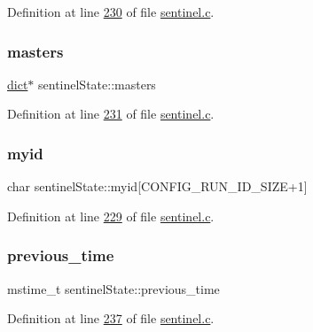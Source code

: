 Definition at line \hyperlink{sentinel_8c_source_l00230}{230} of file \hyperlink{sentinel_8c_source}{sentinel.\+c}.

\mbox{\label{structsentinelState_afa6f3bd36b144f6f7e4a68c659861951}} 
\subsubsection{\texorpdfstring{masters}{masters}}
{\footnotesize\ttfamily \hyperlink{structdict}{dict}$\ast$ sentinel\+State\+::masters}



Definition at line \hyperlink{sentinel_8c_source_l00231}{231} of file \hyperlink{sentinel_8c_source}{sentinel.\+c}.

\mbox{\label{structsentinelState_ad862cfc4b57ae5278c5e5f5109fd19d2}} 
\subsubsection{\texorpdfstring{myid}{myid}}
{\footnotesize\ttfamily char sentinel\+State\+::myid\mbox{[}C\+O\+N\+F\+I\+G\+\_\+\+R\+U\+N\+\_\+\+I\+D\+\_\+\+S\+I\+ZE+1\mbox{]}}



Definition at line \hyperlink{sentinel_8c_source_l00229}{229} of file \hyperlink{sentinel_8c_source}{sentinel.\+c}.

\mbox{\label{structsentinelState_a18b5a3e9feb6876394426d9f4e743373}} 
\subsubsection{\texorpdfstring{previous\+\_\+time}{previous\_time}}
{\footnotesize\ttfamily mstime\+\_\+t sentinel\+State\+::previous\+\_\+time}



Definition at line \hyperlink{sentinel_8c_source_l00237}{237} of file \hyperlink{sentinel_8c_source}{sentinel.\+c}.

